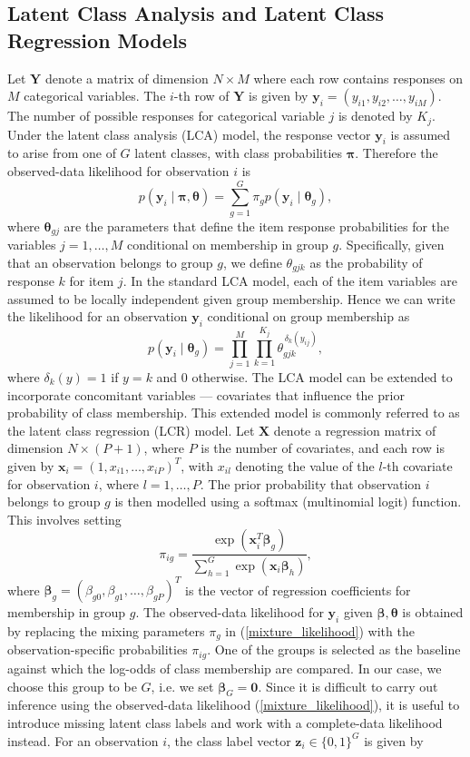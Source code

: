 \documentclass[11pt]{article}
\def\boldx{\mathbf{x}}
\def\boldy{\mathbf{y}}
\def\boldz{\mathbf{z}}
\def\boldX{\mathbf{X}}
\def\boldY{\mathbf{Y}}
\def\bsbet{\boldsymbol{\beta}}
\def\bsthet{\boldsymbol{\theta}}
\def\bspi{\boldsymbol{\pi}}
\theoremstyle{plain}
\theoremstyle{definition}
\begin{document}
\subsection{Latent Class Analysis and Latent Class Regression Models}\label{subsec:LCA_LCR}
Let $\boldY$ denote a matrix of dimension $N \times M$ where each row contains responses on $M$ categorical variables. The $i$-th row of $\boldY$ is given by $\boldy_i = (y_{i1}, y_{i2}, \dots, y_{iM})$. The number of possible responses for categorical variable $j$ is denoted by $K_j$.
Under the latent class analysis (LCA) model, the response vector $\boldy_i$ is assumed to arise from one of $G$ latent classes, with class probabilities $\bspi$. 
Therefore the observed-data likelihood for observation $i$ is
\begin{equation}\label{mixture_likelihood}
    p(\boldy_i \mid \bspi, \bsthet) = \sum_{g=1}^G \pi_g p(\boldy_i \mid \bsthet_g),
\end{equation}
where $\bsthet_{gj}$ are the parameters that define the item response probabilities for the variables $j = 1,\dots,M$ conditional on membership in group $g$. Specifically, given that an observation belongs to group $g$, we define $\theta_{gjk}$ as the probability of response $k$ for item $j$. In the standard LCA model, each of the item variables are assumed to be locally independent given group membership. Hence we can write the likelihood for an observation $\boldy_i$ conditional on group membership as
\[
p(\boldy_i \mid \bsthet_g) = \prod_{j=1}^{M}\prod_{k=1}^{K_j}\theta_{gjk}^{\,\delta_k(y_{ij})},%
\]
where $\delta_k(y) = 1$ if $y=k$ and 0 otherwise. The LCA model can be extended to incorporate concomitant variables --- covariates that influence the prior probability of class membership. This extended model is commonly referred to as the latent class regression (LCR) model. Let $\boldX$ denote a regression matrix of dimension $N \times (P+1)$, where $P$ is the number of covariates, and each row is given by $\boldx_i = (1, x_{i1},\dots,x_{iP})^T$, with $x_{il}$ denoting the value of the $l$-th covariate for observation $i$, where $l = 1,\dots,P$. The prior probability that observation $i$ belongs to group $g$ is then modelled using a softmax (multinomial logit) function. This involves setting 
\[
\pi_{ig} = \frac{\exp\left( \boldx_i^T \bsbet_g \right)}{\sum_{h=1}^G \exp\left( \boldx_i \bsbet_h \right)},
\]
where $\bsbet_g = (\beta_{g0}, \beta_{g1},\dots,\beta_{gP})^T$ is the vector of regression coefficients for membership in group $g$. The observed-data likelihood for $\boldy_i$ given $\bsbet, \bsthet$ is obtained by replacing the mixing parameters $\pi_g$ in (\ref{mixture_likelihood}) with the observation-specific probabilities $\pi_{ig}$. One of the groups is selected as the baseline against which the log-odds of class membership are compared. In our case, we choose this group to be $G$, i.e. we set $\bsbet_G = \mathbf{0}$. Since it is difficult to carry out inference using the observed-data likelihood (\ref{mixture_likelihood}), it is useful to introduce missing latent class labels and work with a complete-data likelihood instead. For an observation $i$, the class label vector $\boldz_i \in \{0,1\}^{G}$ is given by
\end{document}

